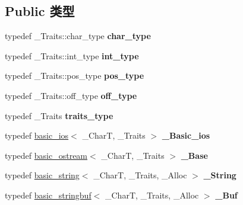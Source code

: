 \subsection*{Public 类型}
\begin{DoxyCompactItemize}
\item 
\mbox{\label{classbasic__ostringstream_af6c11866402b9c67fd05a303077475f2}} 
typedef \+\_\+\+Traits\+::char\+\_\+type {\bfseries char\+\_\+type}
\item 
\mbox{\label{classbasic__ostringstream_a02c40da1e6fad7b192410471c323edb9}} 
typedef \+\_\+\+Traits\+::int\+\_\+type {\bfseries int\+\_\+type}
\item 
\mbox{\label{classbasic__ostringstream_af0d074faf201fde564ee58c59e78c423}} 
typedef \+\_\+\+Traits\+::pos\+\_\+type {\bfseries pos\+\_\+type}
\item 
\mbox{\label{classbasic__ostringstream_a3d7753803f063615e5d12e6444614c07}} 
typedef \+\_\+\+Traits\+::off\+\_\+type {\bfseries off\+\_\+type}
\item 
\mbox{\label{classbasic__ostringstream_a8924d4f5958219116ed97384bf6c8866}} 
typedef \+\_\+\+Traits {\bfseries traits\+\_\+type}
\item 
\mbox{\label{classbasic__ostringstream_a07cbdb59c4118aeda028216328cb96a8}} 
typedef \hyperlink{classbasic__ios}{basic\+\_\+ios}$<$ \+\_\+\+CharT, \+\_\+\+Traits $>$ {\bfseries \+\_\+\+Basic\+\_\+ios}
\item 
\mbox{\label{classbasic__ostringstream_a256f3326e4d8ba6a0c1daa4369293c0f}} 
typedef \hyperlink{classbasic__ostream}{basic\+\_\+ostream}$<$ \+\_\+\+CharT, \+\_\+\+Traits $>$ {\bfseries \+\_\+\+Base}
\item 
\mbox{\label{classbasic__ostringstream_aa334f715b536f000741b1fdbdd8c6498}} 
typedef \hyperlink{classbasic__string}{basic\+\_\+string}$<$ \+\_\+\+CharT, \+\_\+\+Traits, \+\_\+\+Alloc $>$ {\bfseries \+\_\+\+String}
\item 
\mbox{\label{classbasic__ostringstream_ab41b4106c7df27f5a8d4d8a51641efc7}} 
typedef \hyperlink{classbasic__stringbuf}{basic\+\_\+stringbuf}$<$ \+\_\+\+CharT, \+\_\+\+Traits, \+\_\+\+Alloc $>$ {\bfseries \+\_\+\+Buf}
\end{DoxyCompactItemize}
